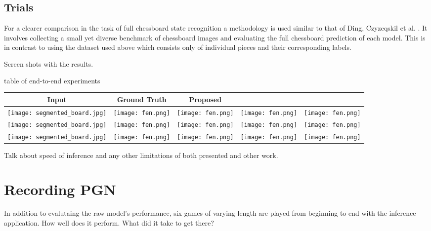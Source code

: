 \subsection{Trials}
For a clearer comparison in the task of full chessboard state recognition a methodology is used similar
to that of Ding, Czyzeqskil et al. \cite{Ding2016ChessVisionC, heatmap}.  It involves collecting a small yet diverse benchmark of chessboard images
and evaluating the full chessboard prediction of each model.  This is in contrast to using the dataset used above which consists only of individual 
pieces and their corresponding labels.


Screen shots with the results.

table of end-to-end experiments

\begin{center}
{\tabulinesep=2mm
\begin{tabu}{|c|c|c|c|c|}
    \hline
    \textbf{Input} & \textbf{Ground Truth} & \textbf{Proposed} & \textbf{\cite{}} & \textbf{\cite{}} \\
    \hline
    \hline
    \texttt{[image: segmented\_board.jpg]} & \texttt{[image: fen.png]} & \texttt{[image: fen.png]} & \texttt{[image: fen.png]} & \texttt{[image: fen.png]} \\
    \hline
    \texttt{[image: segmented\_board.jpg]} & \texttt{[image: fen.png]} & \texttt{[image: fen.png]} & \texttt{[image: fen.png]} & \texttt{[image: fen.png]} \\
    \hline
    \texttt{[image: segmented\_board.jpg]} & \texttt{[image: fen.png]} & \texttt{[image: fen.png]} & \texttt{[image: fen.png]} & \texttt{[image: fen.png]} 
\end{tabu}}
\end{center}


Talk about speed of inference and any other limitations of both presented and other work.

\section{Recording PGN}
\label{evaluate pgn}
In addition to evalutaing the raw model's performance, six games of varying length are played from beginning to end 
with the inference application.  
How well does it perform.  What did it take to get there?

